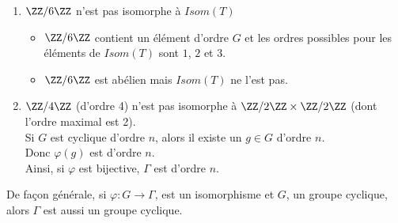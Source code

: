 \documentclass[../main.tex]{subfile}
\begin{document}
\begin{ex}
\begin{enumerate}	
	\item $\ZZ/6\ZZ$ n'est pas isomorphe à $Isom(T)$\\
\begin{itemize}	
	\item $\ZZ/6\ZZ$ contient un élément d'ordre $G$
	et les ordres possibles pour les éléments de $Isom(T)$ sont $1$, $2$ et $3$.
	\item $\ZZ/6\ZZ$ est abélien mais $Isom(T)$ ne l'est pas.
\end{itemize}
	\item $\ZZ/4\ZZ$ (d'ordre 4) n'est pas isomorphe à $\ZZ/2\ZZ \times \ZZ/2\ZZ$ (dont l'ordre maximal est 2).\\
	Si $G$ est cyclique d'ordre $n$, alors il existe un $g \in G$ d'ordre $n$.\\
	Donc $\varphi(g)$ est d'ordre $n$. \\
	Ainsi, si $\varphi$ est bijective, $\Gamma$ est d'ordre $n$.
\end{enumerate}
\end{ex}

\begin{rema}
	De façon générale, si $\varphi : G \to \Gamma$, est un isomorphisme et $G$, un groupe cyclique, 
	alors $\Gamma$ est aussi un groupe cyclique.
\end{rema}
\end{document}
